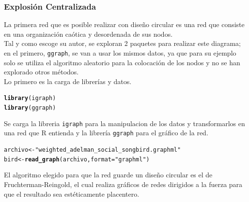 \documentclass{article}\usepackage[]{graphicx}\usepackage[]{color}
\makeatletter
\newcommand{\hlstr}[1]{\textcolor[rgb]{0.192,0.494,0.8}{#1}}%
\newcommand{\hlstd}[1]{\textcolor[rgb]{0.345,0.345,0.345}{#1}}%
\newcommand{\hlkwb}[1]{\textcolor[rgb]{0.69,0.353,0.396}{#1}}%
\newcommand{\hlkwc}[1]{\textcolor[rgb]{0.333,0.667,0.333}{#1}}%
\newcommand{\hlkwd}[1]{\textcolor[rgb]{0.737,0.353,0.396}{\textbf{#1}}}%
\newenvironment{kframe}{%
 \def\at@end@of@kframe{}%
 \ifinner\ifhmode%
  \def\at@end@of@kframe{\end{minipage}}%
  \begin{minipage}{\columnwidth}%
 \fi\fi%
 \def\FrameCommand##1{\hskip\@totalleftmargin \hskip-\fboxsep
 \colorbox{shadecolor}{##1}\hskip-\fboxsep
     \hskip-\linewidth \hskip-\@totalleftmargin \hskip\columnwidth}%
 \MakeFramed {\advance\hsize-\width
   \@totalleftmargin\z@ \linewidth\hsize
   \@setminipage}}%
 {\par\unskip\endMakeFramed%
 \at@end@of@kframe}
\newenvironment{knitrout}{}{} %
\makeatother
\begin{document}
\subsubsection{Explosi\'on Centralizada}
La primera red que es posible realizar con dise\~no circular es una red que consiste en una organizaci\'on ca\'otica y desordenada de sus nodos.~\\
Tal y como escoge su autor, se exploran 2 paquetes para realizar este diagrama; en el primero, \texttt{ggraph}\cite{docu_ggraph}, se van a usar los mismos datos, ya que para su ejemplo solo se utiliza el algoritmo aleatorio para la colocaci\'on de los nodos y no se han explorado otros m\'etodos.~\\
Lo primero es la carga de librer\'ias y datos.
\begin{knitrout}
\color{fgcolor}\begin{kframe}
\begin{alltt}
\hlkwd{library}\hlstd{(igraph)}
\hlkwd{library}\hlstd{(ggraph)}
\end{alltt}
\end{kframe}
\end{knitrout}
Se carga la libreria \texttt{igraph}\cite{docu_igraph} para la manipulacion de los datos y transformarlos en una red que R entienda y la librer\'ia \texttt{ggraph} para el gr\'afico de la red.
\begin{knitrout}
\color{fgcolor}\begin{kframe}
\begin{alltt}
\hlstd{archivo} \hlkwb{<-}\hlstr{"weighted_adelman_social_songbird.graphml"}
\hlstd{bird} \hlkwb{<-} \hlkwd{read_graph}\hlstd{( archivo ,} \hlkwc{format} \hlstd{=}\hlstr{"graphml"}\hlstd{)}
\end{alltt}
\end{kframe}
\end{knitrout}
El algoritmo elegido para que la red guarde un dise\~no circular es el de Fruchterman-Reingold, el cual realiza gr\'aficos de redes dirigidos a la fuerza para que el resultado sea est\'eticamente placentero.
\end{document}
